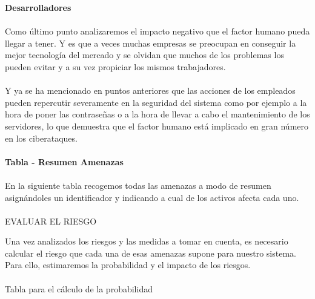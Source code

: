 \textbf{Desarrolladores}
\paragraph{}
Como último punto analizaremos el impacto negativo que el factor
humano pueda llegar a tener. Y es que a veces muchas empresas se
preocupan en conseguir la mejor tecnología del mercado y se olvidan
que muchos de los problemas los pueden evitar y a su vez propiciar los
mismos trabajadores.
\paragraph{}
Y ya se ha mencionado en puntos anteriores que las acciones de los
empleados pueden repercutir severamente en la seguridad del sistema
como por ejemplo a la hora de poner las contraseñas o a la hora de
llevar a cabo el mantenimiento de los servidores, lo que demuestra que
el factor humano está implicado en gran número en los ciberataques.

\paragraph{}
\textbf{Tabla - Resumen Amenazas}
\paragraph{}
En la siguiente tabla recogemos todas las amenazas a modo de resumen
asignándoles un identificador y indicando a cual de los activos afecta
cada uno.



\paragraph{}
EVALUAR EL RIESGO

Una vez analizados los riesgos y las medidas a tomar en cuenta, es
necesario calcular el riesgo que cada una de esas amenazas supone para
nuestro sistema. Para ello, estimaremos la probabilidad y el impacto
de los riesgos.\\


\paragraph{}
Tabla para el cálculo de la probabilidad
